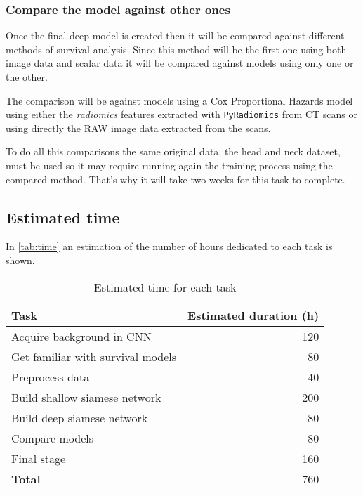 \subsubsection{Compare the model against other ones}

Once the final deep model is created then it will be compared against different methods of 
survival analysis. Since this method will be the first one using both image data and scalar 
data it will be compared against models using only one or the other. 

The comparison will be against models using a Cox Proportional Hazards model using either
the \emph{radiomics} features extracted with \texttt{PyRadiomics} from CT scans or using 
directly the RAW image data extracted from the scans.

To do all this comparisons the same original data, the head and neck dataset, must be 
used so it may require running again the training process using the compared method. 
That's why it will take two weeks for this task to complete.

\subsection{Estimated time}

In \autoref{tab:time} an estimation of the number of hours dedicated to each task is shown.

\begin{table}[H]
  \centering{}
  \begin{tabular}{|l|r|}
    \hline
    Task & Estimated duration (h) \\ \hline \hline
    Acquire background in CNN & 120 \\ \hline
    Get familiar with survival models & 80 \\ \hline
    Preprocess data & 40 \\ \hline
    Build shallow siamese network & 200 \\ \hline
    Build deep siamese network & 80 \\ \hline
    Compare models & 80 \\ \hline
    Final stage & 160 \\ 

  
    \hline \hline
    \textbf{Total} & 760 \\
    \hline
  \end{tabular}
  \caption{Estimated time for each task \label{tab:time}}
\end{table}

